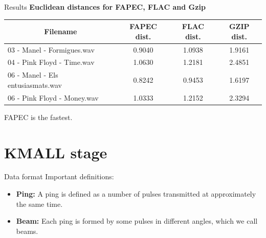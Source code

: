 \documentclass[usenames,dvipsnames]{beamer}
\begin{document}
\begin{frame}{Results}
\textbf{Euclidean distances for FAPEC, FLAC and Gzip}
\vspace{1em}

\footnotesize
\begin{tabular}{|
		>{}l |
		>{}c |
		>{}c |c|}
	\hline
	\multicolumn{1}{|c|}{\cellcolor[HTML]{d6cefc}Filename} & \cellcolor[HTML]{d6cefc}FAPEC dist. & \cellcolor[HTML]{d6cefc}FLAC dist. & \cellcolor[HTML]{d6cefc}GZIP dist. \\ \hline
	03 - Manel - Formigues.wav                             & 0.9040                                 & 1.0938                                & 1.9161                                \\ \hline
	04 - Pink Floyd - Time.wav                             & 1.0630                                 & 1.2181                                & 2.4851                                \\ \hline
	06 - Manel - Els entusiasmats.wav                      & 0.8242                                 & 0.9453                                & 1.6197                                \\ \hline
	06 - Pink Floyd - Money.wav                            & 1.0333                                 & 1.2152                                & 2.3294                                \\ \hline
\end{tabular}
\normalsize
\vspace{1.5em}

FAPEC is the fastest.
\end{frame}

\section{KMALL stage}
\begin{frame}{Data format}
Important definitions:
\begin{itemize}
	\item<2-> \textbf{Ping:} A ping is defined as a number of pulses transmitted at approximately the same time.
	\item<3-> \textbf{Beam:} Each ping is formed by some pulses in different angles, which we call beams.
\end{itemize}
\end{frame}
\end{document}
